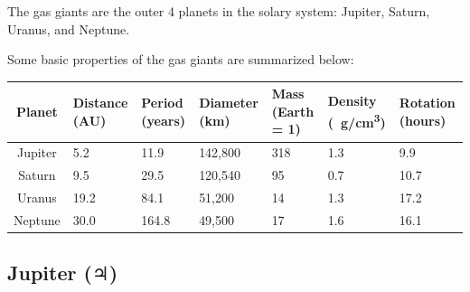 \documentclass{article}
\numberwithin{equation}{section}
\numberwithin{figure}{section}
\begin{document}
The gas giants are the outer 4 planets in the solary system: Jupiter, Saturn, Uranus, and Neptune.

Some basic properties of the gas giants are summarized below:

\begin{center}
\begin{tabular}{|c|m{1.6cm}|m{1.6cm}|m{1.6cm}|m{2cm}|m{1.6cm}|m{1.6cm}|}
\hline
\textbf{Planet}	& \textbf{Distance (AU)} & \textbf{Period (years)} & \textbf{Diameter (km)} & \textbf{Mass (Earth = 1)} & \textbf{Density (\SI{}{g/cm^3})} & \textbf{Rotation (hours)}\\
\hline
Jupiter	& 5.2	& 11.9	& 142,800	& 318	& 1.3	& 9.9\\
Saturn	& 9.5	& 29.5	& 120,540	& 95	& 0.7	& 10.7\\
Uranus	& 19.2	& 84.1	& 51,200	& 14	& 1.3	& 17.2\\
Neptune	& 30.0	& 164.8	& 49,500	& 17	& 1.6	& 16.1\\
\hline
\end{tabular}
\end{center}

\subsection{Jupiter ($\Jupiter$)} \label{wX3zAX}

\begin{center}
    \captionsetup{type=figure,margin=1in,font=scriptsize}
\end{center}
\end{document}
